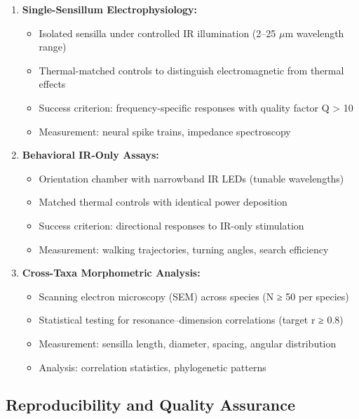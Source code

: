 \documentclass[
  13pt,
  a4paperpaper,
  12pt]{article}
\providecommand{\tightlist}{%
  \setlength{\itemsep}{0pt}\setlength{\parskip}{0pt}}
\begin{document}
\begin{enumerate}
\def\labelenumi{\arabic{enumi}.}
\tightlist
\item
  \textbf{Single-Sensillum Electrophysiology:}

  \begin{itemize}
  \tightlist
  \item
    Isolated sensilla under controlled IR illumination (2--25
    \(\mu\mathrm{m}\) wavelength range)
  \item
    Thermal-matched controls to distinguish electromagnetic from thermal
    effects
  \item
    Success criterion: frequency-specific responses with quality factor
    Q \textgreater{} 10
  \item
    Measurement: neural spike trains, impedance spectroscopy
  \end{itemize}
\item
  \textbf{Behavioral IR-Only Assays:}

  \begin{itemize}
  \tightlist
  \item
    Orientation chamber with narrowband IR LEDs (tunable wavelengths)
  \item
    Matched thermal controls with identical power deposition
  \item
    Success criterion: directional responses to IR-only stimulation
  \item
    Measurement: walking trajectories, turning angles, search efficiency
  \end{itemize}
\item
  \textbf{Cross-Taxa Morphometric Analysis:}

  \begin{itemize}
  \tightlist
  \item
    Scanning electron microscopy (SEM) across species (N ≥ 50 per
    species)
  \item
    Statistical testing for resonance--dimension correlations (target r
    ≥ 0.8)
  \item
    Measurement: sensilla length, diameter, spacing, angular
    distribution
  \item
    Analysis: correlation statistics, phylogenetic patterns
  \end{itemize}
\end{enumerate}

\subsection{Reproducibility and Quality
Assurance}\label{reproducibility-and-quality-assurance}
\end{document}
